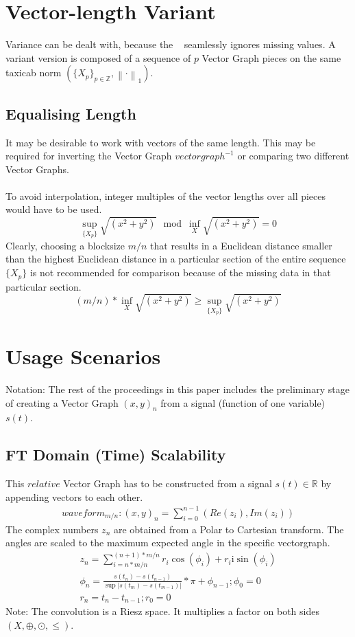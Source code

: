 \documentclass{report}
\newcommand\norm[1]{\left\lVert#1\right\rVert}
\begin{document}
\chapter{Vector-length Variant}
Variance can be dealt with, because the ~\cite[Stopeight\_Analyzer.tex]{Analyzer} seamlessly ignores missing values. A variant version is composed of a sequence of $p$ Vector Graph pieces on the same taxicab norm $(\{X_{p}\}_{p\in \mathbb{Z}},\norm{\cdot}_1)$.
\section{Equalising Length}
It may be desirable to work with vectors of the same length. This may be required for inverting the Vector Graph $vectorgraph^{-1}$ or comparing two different Vector Graphs.\\\\
To avoid interpolation, integer multiples of the vector lengths over all pieces would have to be used.
\begin{equation}
\sup \limits _{\{X_{p}\}} \sqrt{(x^2+y^2)} \mod \inf \limits _{X} \sqrt{(x^2+y^2)} = 0
\end{equation}
Clearly, choosing a blocksize $m/n$ that results in a Euclidean distance smaller than the highest Euclidean distance in a particular section of the entire sequence $\{X_{p}\}$ is not recommended for comparison because of the missing data in that particular section.
\begin{equation}
(m/n)*\inf \limits _{X} \sqrt{(x^2+y^2)} \geq \sup \limits _{\{X_{p}\}} \sqrt{(x^2+y^2)}\label{eq:4}
\end{equation}

\chapter{Usage Scenarios}
Notation: The rest of the proceedings in this paper includes the preliminary stage of creating a Vector Graph $(x,y)_{n}$ from a signal (function of one variable) $s(t)$.
\section{FT Domain (Time) Scalability}
This $relative$ Vector Graph has to be constructed from a signal $s(t)\in \mathbb{R}$ by appending vectors to each other.
\begin{align}
waveform_{m/n}: (x,y)_{n}=\sum \limits _{i=0}^{n-1}(Re(z_{i}),Im(z_{i}))
\end{align}
The complex numbers $z_{n}$ are obtained from a Polar to Cartesian transform. The angles are scaled to the maximum expected angle in the specific vectorgraph.
\begin{align}
z_{n}=\sum \limits _{i=n*m/n}^{(n+1)*m/n}r_{i}\cos(\phi_{i})+r_{i}\mathrm{i}\sin(\phi_{i})\\
\phi_{n}=\frac{s(t_{n})-s(t_{n-1})}{\sup \lvert s(t_{m})-s(t_{m-1}) \rvert}*\pi+\phi_{n-1};\phi_{0}=0\\
r_{n}=t_{n}-t_{n-1};r_{0}=0
\end{align}
Note: The convolution is a Riesz space. It multiplies a factor on both sides $(X,\oplus,\odot,\leq)$.
\end{document}
